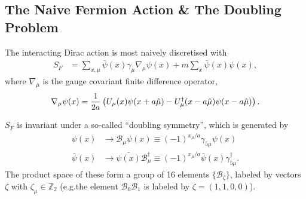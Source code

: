 \subsection{The Naive Fermion Action \& The Doubling Problem}

The interacting Dirac action is most naively discretised with
\begin{align}
 S_F &= \sum_{x,\mu} \bar{\psi}(x) \gamma_{\mu} \nabla_{\mu} \psi(x) + m\sum_x \bar{\psi}(x) \psi(x),
 \label{eq:naivefermions}
\end{align}
where $\nabla_{\mu}$ is the gauge covariant finite difference operator,
\begin{align}	
	\nabla_{\mu} \psi(x) = {1\over 2a} \left( U_{\mu} (x) \psi(x+a\hat{\mu}) - U^{\dagger}_{\mu}(x-a\hat{\mu})\psi(x-a\hat{\mu}) \right).
\label{eq:lat_derivative}
\end{align}

$S_F$ is invariant under a so-called ``doubling symmetry'', which is generated by
\begin{align}
  \label{eq:doublingsymmetry}
  \psi(x) & \to \mathcal{B}_{\mu} \psi(x) \equiv  (-1)^{x_{\mu}/a} \gamma_{5\mu} \psi(x) \\
  \bar{\psi}(x) & \to \bar{\psi(x)}\mathcal{B}^{\dagger}_{\mu} \equiv (-1)^{x_{\mu}/a} \bar{\psi}(x) \gamma^{\dagger}_{5\mu}.
\end{align}
The product space of these form a group of 16 elements $\{\mathcal{B}_{\zeta}\}$, labeled by vectors $\zeta$ with $\zeta_{\mu}\in \mathbb{Z}_2$ (e.g.the element $\mathcal{B}_{0}\mathcal{B}_{1}$ is labeled by $\zeta=(1,1,0,0)$).

